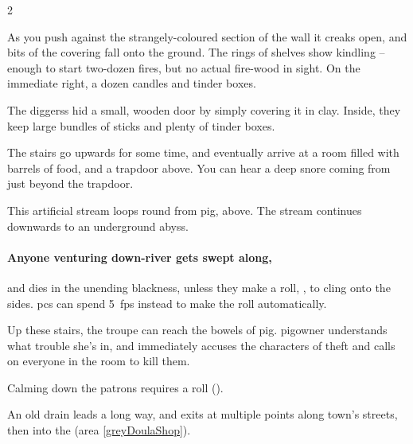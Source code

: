 \begin{multicols}{2}

\begin{boxtext}
  As you push against the strangely-coloured section of the wall it creaks open, and bits of the covering fall onto the ground.
  The rings of shelves show kindling -- enough to start two-dozen fires, but no actual fire-wood in sight.
  On the immediate right, a dozen candles and tinder boxes.
\end{boxtext}

The \glspl{diggers} hid a small, wooden door by simply covering it in clay.
Inside, they keep large bundles of sticks and plenty of tinder boxes.


\begin{boxtext}
  The stairs go upwards for some time, and eventually arrive at a room filled with barrels of food, and a trapdoor above.
  You can hear a deep snore coming from just beyond the trapdoor.
\end{boxtext}

This artificial stream loops round from \gls{pig}, above.
The stream continues downwards to an underground abyss.

\paragraph{Anyone venturing down-river gets swept along,}
and dies in the unending blackness, unless they make a  roll, \tn[10], to cling onto the sides.
\Glspl{pc} can spend 5~\glspl{fp} instead to make the roll automatically.


Up these stairs, the troupe can reach the bowels of \gls{pig}.
\Gls{pigowner} understands what trouble she's in, and immediately accuses the characters of theft and calls on everyone in the room to kill them.

Calming down the patrons requires a  roll (\tn[10]).


An old drain leads a long way, and exits at multiple points along \gls{town}'s streets, then into the  (area \vref{greyDoulaShop}).

\end{multicols}
